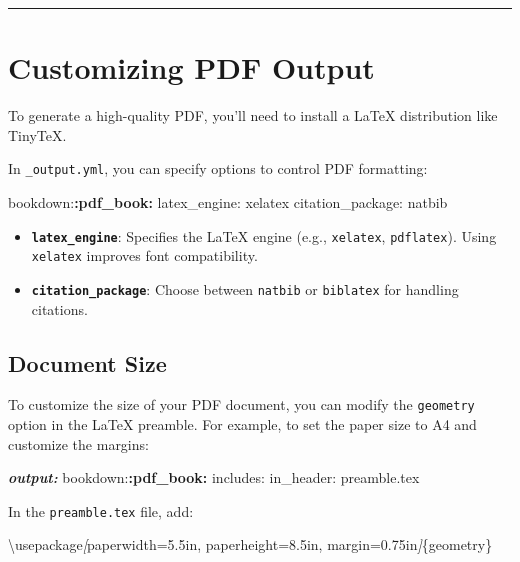 \documentclass[
]{book}
\newenvironment{Shaded}{\begin{snugshade}}{\end{snugshade}}
\newcommand{\AnnotationTok}[1]{\textcolor[rgb]{0.56,0.35,0.01}{\textbf{\textit{#1}}}}
\newcommand{\CommentTok}[1]{\textcolor[rgb]{0.56,0.35,0.01}{\textit{#1}}}
\newcommand{\NormalTok}[1]{#1}
\newcommand{\OtherTok}[1]{\textcolor[rgb]{0.56,0.35,0.01}{#1}}
\newcommand{\SpecialCharTok}[1]{\textcolor[rgb]{0.81,0.36,0.00}{\textbf{#1}}}
\providecommand{\tightlist}{%
  \setlength{\itemsep}{0pt}\setlength{\parskip}{0pt}}
\theoremstyle{definition}
\theoremstyle{definition}
\theoremstyle{definition}
\theoremstyle{definition}
\theoremstyle{remark}
\begin{document}
\begin{center}\rule{0.5\linewidth}{0.5pt}\end{center}

\section{Customizing PDF Output}\label{customizing-pdf-output}

To generate a high-quality PDF, you'll need to install a LaTeX distribution like TinyTeX.

In \texttt{\_output.yml}, you can specify options to control PDF formatting:

\begin{Shaded}
\begin{Highlighting}[]
\NormalTok{bookdown:}\SpecialCharTok{:pdf\_book:}
\NormalTok{  latex\_engine: xelatex}
\NormalTok{  citation\_package: natbib}
\end{Highlighting}
\end{Shaded}

\begin{itemize}
\tightlist
\item
  \textbf{\texttt{latex\_engine}}: Specifies the LaTeX engine (e.g., \texttt{xelatex}, \texttt{pdflatex}). Using \texttt{xelatex} improves font compatibility.
\item
  \textbf{\texttt{citation\_package}}: Choose between \texttt{natbib} or \texttt{biblatex} for handling citations.
\end{itemize}

\subsection{Document Size}\label{document-size}

To customize the size of your PDF document, you can modify the \texttt{geometry} option in the LaTeX preamble. For example, to set the paper size to A4 and customize the margins:

\begin{Shaded}
\begin{Highlighting}[]
\AnnotationTok{output:}
\NormalTok{  bookdown:}\SpecialCharTok{:pdf\_book:}
\NormalTok{    includes:}
\NormalTok{      in\_header: preamble.tex}
\end{Highlighting}
\end{Shaded}

In the \texttt{preamble.tex} file, add:

\begin{Shaded}
\begin{Highlighting}[]
\NormalTok{\textbackslash{}usepackage}\CommentTok{[}\OtherTok{paperwidth=5.5in, paperheight=8.5in, margin=0.75in}\CommentTok{]}\NormalTok{\{geometry\}}
\end{Highlighting}
\end{Shaded}
\end{document}
